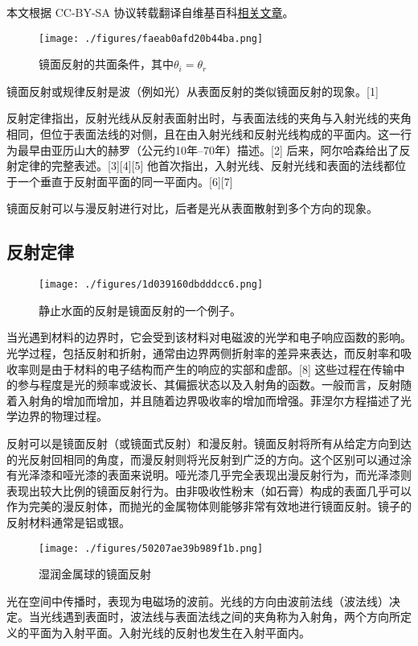 
本文根据 CC-BY-SA 协议转载翻译自维基百科\href{https://en.wikipedia.org/wiki/Specular_reflection}{相关文章}。

\begin{figure}[ht]
\centering
\texttt{[image: ./figures/faeab0afd20b44ba.png]}
\caption{镜面反射的共面条件，其中\(\theta_i = \theta_r\)} \label{fig_JMFS_1}
\end{figure}
镜面反射或规律反射是波（例如光）从表面反射的类似镜面反射的现象。[1]

反射定律指出，反射光线从反射表面射出时，与表面法线的夹角与入射光线的夹角相同，但位于表面法线的对侧，且在由入射光线和反射光线构成的平面内。这一行为最早由亚历山大的赫罗（公元约10年–70年）描述。[2] 后来，阿尔哈森给出了反射定律的完整表述。[3][4][5] 他首次指出，入射光线、反射光线和表面的法线都位于一个垂直于反射面平面的同一平面内。[6][7]

镜面反射可以与漫反射进行对比，后者是光从表面散射到多个方向的现象。
\subsection{反射定律}
\begin{figure}[ht]
\centering
\texttt{[image: ./figures/1d039160dbdddcc6.png]}
\caption{静止水面的反射是镜面反射的一个例子。} \label{fig_JMFS_2}
\end{figure}
当光遇到材料的边界时，它会受到该材料对电磁波的光学和电子响应函数的影响。光学过程，包括反射和折射，通常由边界两侧折射率的差异来表达，而反射率和吸收率则是由于材料的电子结构而产生的响应的实部和虚部。[8] 这些过程在传输中的参与程度是光的频率或波长、其偏振状态以及入射角的函数。一般而言，反射随着入射角的增加而增加，并且随着边界吸收率的增加而增强。菲涅尔方程描述了光学边界的物理过程。

反射可以是镜面反射（或镜面式反射）和漫反射。镜面反射将所有从给定方向到达的光反射回相同的角度，而漫反射则将光反射到广泛的方向。这个区别可以通过涂有光泽漆和哑光漆的表面来说明。哑光漆几乎完全表现出漫反射行为，而光泽漆则表现出较大比例的镜面反射行为。由非吸收性粉末（如石膏）构成的表面几乎可以作为完美的漫反射体，而抛光的金属物体则能够非常有效地进行镜面反射。镜子的反射材料通常是铝或银。
\begin{figure}[ht]
\centering
\texttt{[image: ./figures/50207ae39b989f1b.png]}
\caption{湿润金属球的镜面反射} \label{fig_JMFS_3}
\end{figure}
光在空间中传播时，表现为电磁场的波前。光线的方向由波前法线（波法线）决定。当光线遇到表面时，波法线与表面法线之间的夹角称为入射角，两个方向所定义的平面为入射平面。入射光线的反射也发生在入射平面内。

